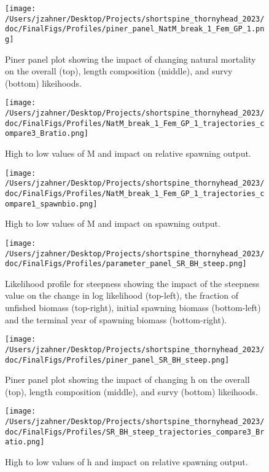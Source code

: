 \documentclass[11pt,
  english,
  letterpaper,
]{article}
\begin{document}
\begin{figure}
\centering
\texttt{[image: /Users/jzahner/Desktop/Projects/shortspine\_thornyhead\_2023/doc/FinalFigs/Profiles/piner\_panel\_NatM\_break\_1\_Fem\_GP\_1.png]}
\caption{Piner panel plot showing the impact of changing natural mortality on the overall (top), length composition (middle), and survy (bottom) likeihoods.\label{fig:M_prof}}
\end{figure}

\begin{figure}
\centering
\texttt{[image: /Users/jzahner/Desktop/Projects/shortspine\_thornyhead\_2023/doc/FinalFigs/Profiles/NatM\_break\_1\_Fem\_GP\_1\_trajectories\_compare3\_Bratio.png]}
\caption{High to low values of M and impact on relative spawning output.\label{fig:M_relspawnout}}
\end{figure}

\begin{figure}
\centering
\texttt{[image: /Users/jzahner/Desktop/Projects/shortspine\_thornyhead\_2023/doc/FinalFigs/Profiles/NatM\_break\_1\_Fem\_GP\_1\_trajectories\_compare1\_spawnbio.png]}
\caption{High to low values of M and impact on spawning output.\label{fig:M_spawnout}}
\end{figure}

\begin{figure}
\centering
\texttt{[image: /Users/jzahner/Desktop/Projects/shortspine\_thornyhead\_2023/doc/FinalFigs/Profiles/parameter\_panel\_SR\_BH\_steep.png]}
\caption{Likelihood profile for steepness showing the impact of the steepness value on the change in log likelihood (top-left), the fraction of unfished biomass (top-right), initial spawning biomass (bottom-left) and the terminal year of spawning biomass (bottom-right).\label{fig:h_prof}}
\end{figure}

\begin{figure}
\centering
\texttt{[image: /Users/jzahner/Desktop/Projects/shortspine\_thornyhead\_2023/doc/FinalFigs/Profiles/piner\_panel\_SR\_BH\_steep.png]}
\caption{Piner panel plot showing the impact of changing h on the overall (top), length composition (middle), and survy (bottom) likeihoods.\label{fig:h_piner_prof}}
\end{figure}

\begin{figure}
\centering
\texttt{[image: /Users/jzahner/Desktop/Projects/shortspine\_thornyhead\_2023/doc/FinalFigs/Profiles/SR\_BH\_steep\_trajectories\_compare3\_Bratio.png]}
\caption{High to low values of h and impact on relative spawning output.\label{fig:h_spawnout}}
\end{figure}
\end{document}
